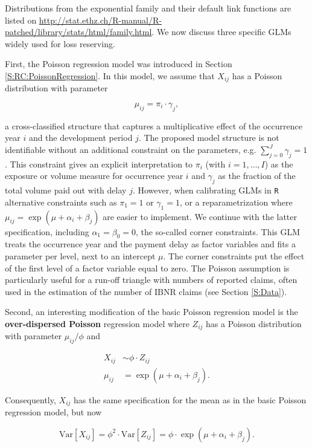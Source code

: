 \documentclass[]{book}
\begin{document}
Distributions from the exponential family and their default link
functions are listed on
\url{http://stat.ethz.ch/R-manual/R-patched/library/stats/html/family.html}.
We now discuss three specific GLMs widely used for loss reserving.

First, the Poisson regression model was introduced in Section
\ref{S:RC:PoissonRegression}. In this model, we assume that \(X_{ij}\)
has a Poisson distribution with parameter

\[
\mu_{ij} = \pi_i \cdot \gamma_j,
\]

a cross-classified structure that captures a multiplicative effect of
the occurrence year \(i\) and the development period \(j\). The proposed
model structure is not identifiable without an additional constraint on
the parameters, e.g. \(\sum_{j=0}^J \gamma_j=1\). This constraint gives
an explicit interpretation to \(\pi_i\) (with \(i=1,\ldots,I\)) as the
exposure or volume measure for occurrence year \(i\) and \(\gamma_j\) as
the fraction of the total volume paid out with delay \(j\). However,
when calibrating GLMs in \texttt{R} alternative constraints such as
\(\pi_1=1\) or \(\gamma_1=1\), or a reparametrization where
\(\mu_{ij} = \exp{(\mu+\alpha_i+\beta_j)}\) are easier to implement. We
continue with the latter specification, including
\(\alpha_1 = \beta_0 = 0\), the so-called corner constraints. This GLM
treats the occurrence year and the payment delay as factor variables and
fits a parameter per level, next to an intercept \(\mu\). The corner
constraints put the effect of the first level of a factor variable equal
to zero. The Poisson assumption is particularly useful for a run-off
triangle with numbers of reported claims, often used in the estimation
of the number of IBNR claims (see Section \ref{S:Data}).

Second, an interesting modification of the basic Poisson regression
model is the \textbf{over-dispersed Poisson} regression model where
\(Z_{ij}\) has a Poisson distribution with parameter \(\mu_{ij}/\phi\)
and

\[
\begin{array}{rl}
X_{ij} &\sim  \phi \cdot Z_{ij}  \\
\mu_{ij} &= \exp{(\mu + \alpha_i + \beta_j)}.
\end{array}
\]

Consequently, \(X_{ij}\) has the same specification for the mean as in
the basic Poisson regression model, but now

\[
\text{Var}[X_{ij}] = \phi^2 \cdot \text{Var}[Z_{ij}] = \phi \cdot \exp{(\mu + \alpha_i + \beta_j)}.
\]
\end{document}
